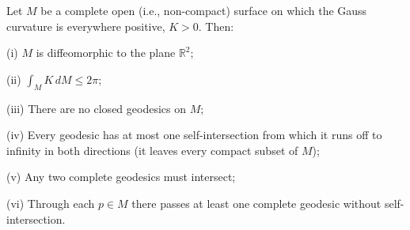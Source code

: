 Let $M$ be a complete open (i.e., non-compact) surface on which the Gauss curvature is everywhere positive, $K > 0$. Then:

(i) $M$ is diffeomorphic to the plane $\mathbb{R}^2$;

(ii) $\int_M K\,dM \leq 2\pi$;

(iii) There are no closed geodesics on $M$;

(iv) Every geodesic has at most one self-intersection from which it runs off to infinity in both directions (it leaves every compact subset of $M$);

(v) Any two complete geodesics must intersect;

(vi) Through each $p \in M$ there passes at least one complete geodesic without self-intersection.
